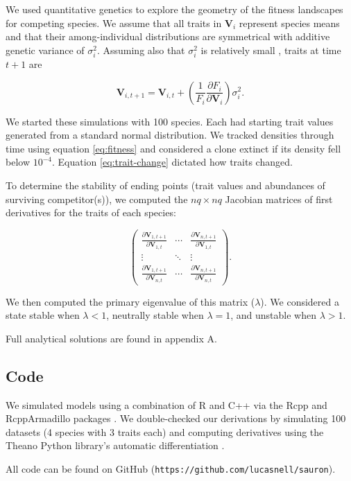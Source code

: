 We used quantitative genetics to explore the geometry of the fitness landscapes for
competing species.
We assume that all traits in $\mathbf{V}_i$ represent species means and that their
among-individual distributions are symmetrical with additive genetic variance
of $\sigma^2_i$.
Assuming also that $\sigma^2_i$ is relatively small
\citep{Iwasa:1991eo,Abrams:2001va,Abrams:1993cr}, traits at time $t+1$ are

\begin{equation} \label{eq:trait-change}
    \mathbf{V}_{i,t+1} = \mathbf{V}_{i,t} + \left( \frac{1}{F_i}
        \frac{\partial F_i}{\partial \mathbf{V}_{i}} \right) \sigma^2_i
    \textrm{.}
\end{equation}

We started these simulations with 100 species.
Each had starting trait values generated from a standard normal distribution.
We tracked densities through time using equation \ref{eq:fitness} and
considered a clone extinct if its density fell below $10^{-4}$.
Equation \ref{eq:trait-change} dictated how traits changed.

To determine the stability of ending points (trait values and abundances of surviving
competitor(s)), we computed the $nq \times nq$ Jacobian matrices of first derivatives
for the traits of each species:

\begin{equation} \label{eq:jacobian}
    \begin{pmatrix}
        \frac{\partial \mathbf{V}_{1,t+1}}{\partial \mathbf{V}_{1,t}} & \cdots &
            \frac{\partial \mathbf{V}_{n,t+1}}{\partial \mathbf{V}_{1,t}} \\
        \vdots & \ddots & \vdots \\
        \frac{\partial \mathbf{V}_{1,t+1}}{\partial \mathbf{V}_{n,t}} & \cdots &
            \frac{\partial \mathbf{V}_{n,t+1}}{\partial \mathbf{V}_{n,t}}
    \end{pmatrix}
    \textrm{.}
\end{equation}

We then computed the primary eigenvalue of this matrix ($\lambda$).
We considered a state stable when $\lambda < 1$,
neutrally stable when $\lambda = 1$,
and unstable when $\lambda > 1$.

Full analytical solutions are found in appendix A.


\subsection*{Code}

We simulated models using a combination of R \citep{RCoreTeam:2018wf} and
C++ via the Rcpp and RcppArmadillo packages
\citep{Eddelbuettel:2014ad,Eddelbuettel:2013if,Sanderson:2016cs}.
We double-checked our derivations by simulating 100 datasets
(4 species with 3 traits each) and computing derivatives using the Theano Python
library's automatic differentiation \citep{TheanoDevelopmentTeam:2016uc}.

All code can be found on GitHub
(\texttt{https://github.com/lucasnell/sauron}).

